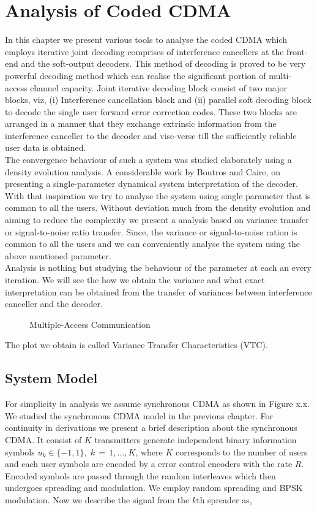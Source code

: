 \chapter{Analysis of Coded CDMA}

In this chapter we present various tools to analyse the coded CDMA which employs iterative joint decoding comprises of interference cancellers at the front-end and the soft-output decoders. This method of decoding is proved to be very powerful decoding method which can realise the significant portion of multi-access channel capacity. Joint iterative decoding block consist of two major blocks, viz, (i) Interference cancellation block and (ii) parallel soft decoding block to decode the single user forward error correction codes. These two blocks are arranged in a manner that they exchange extrinsic information from the interference canceller to the decoder and vise-verse till the sufficiently reliable user data is obtained. \\

The convergence behaviour of such a system was studied elaborately using a density evolution analysis. A considerable work by Boutros and Caire, on presenting a single-parameter dynamical system interpretation of the decoder. With that inspiration we try to analyse the system using single parameter that is common to all the users. Without deviation much from the density evolution and aiming to reduce the complexity we present a analysis based on variance transfer or signal-to-noise ratio transfer. Since, the variance or signal-to-noise ration is common to all the users and we can conveniently analyse the system using the above mentioned parameter. \\

Analysis is nothing but studying the behaviour of the parameter at each an every iteration. We will see the how we obtain the variance and what exact interpretation can be obtained from the transfer of variances between interference canceller and the decoder. \\
\begin{figure}[htb]
  \centerline{  }
  \caption{Multiple-Access Communication}
\end{figure}
The plot we obtain is called Variance Transfer Characteristics (VTC).
\section{System Model}
For simplicity in analysis we assume synchronous CDMA as shown in Figure x.x. We studied the synchronous CDMA model in the previous chapter. For continuity in derivations we present a brief description about the synchronous CDMA. It consist of $K$ transmitters generate independent binary information symbols $u_k\in \{-1,1\},\;k\,=\,1,\dots,K$, where $K$ corresponds to the number of users and each user symbols are encoded by a error control encoders with the rate $R$. Encoded symbols are passed through the random interleaves which then undergoes spreading and modulation. We employ random spreading and BPSK modulation. Now we describe the signal from the $k$th spreader as,


